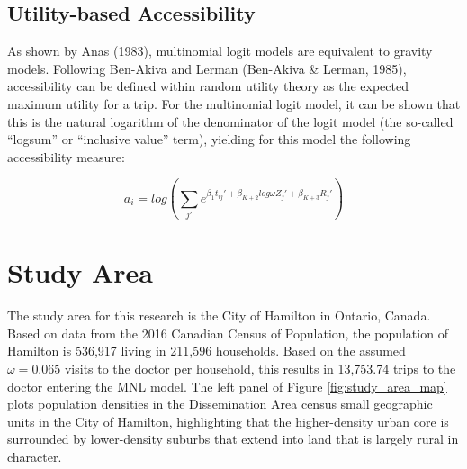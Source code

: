 \documentclass{article}
\begin{document}
\hypertarget{utility-based-accessibility}{%
\subsection{Utility-based
Accessibility}\label{utility-based-accessibility}}

As shown by Anas (1983), multinomial logit models are equivalent to
gravity models. Following Ben-Akiva and Lerman (Ben-Akiva \& Lerman,
1985), accessibility can be defined within random utility theory as the
expected maximum utility for a trip. For the multinomial logit model, it
can be shown that this is the natural logarithm of the denominator of
the logit model (the so-called ``logsum'' or ``inclusive value'' term),
yielding for this model the following accessibility measure:

\[
a_i = log(\sum_{j\prime} e^{\beta_1 t_{ij}\prime + \beta_{K+2} log \omega Z_j\prime + \beta_{K + 3} R_j\prime})
\]

\hypertarget{study-area}{%
\section{Study Area}\label{study-area}}

The study area for this research is the City of Hamilton in Ontario,
Canada. Based on data from the 2016 Canadian Census of Population, the
population of Hamilton is 536,917 living in 211,596 households. Based on
the assumed \(\omega = 0.065\) visits to the doctor per household, this
results in 13,753.74 trips to the doctor entering the MNL model. The
left panel of Figure \ref{fig:study_area_map} plots population densities
in the Dissemination Area census small geographic units in the City of
Hamilton, highlighting that the higher-density urban core is surrounded
by lower-density suburbs that extend into land that is largely rural in
character.
\end{document}
